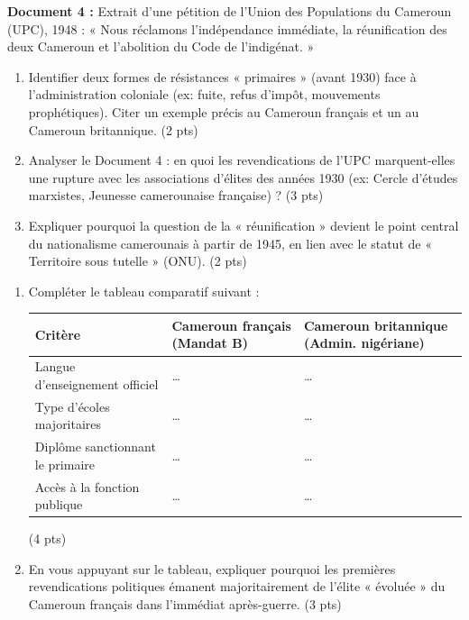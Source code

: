 \documentclass[11pt]{article}
\begin{document}
\begin{exercice}
\textbf{Document 4 :} Extrait d'une pétition de l'Union des Populations du Cameroun (UPC), 1948 : « Nous réclamons l'indépendance immédiate, la réunification des deux Cameroun et l'abolition du Code de l'indigénat. »
\begin{enumerate}
    \item Identifier deux formes de résistances « primaires » (avant 1930) face à l'administration coloniale (ex: fuite, refus d'impôt, mouvements prophétiques). Citer un exemple précis au Cameroun français et un au Cameroun britannique. (2 pts)
    \item Analyser le Document 4 : en quoi les revendications de l'UPC marquent-elles une rupture avec les associations d'élites des années 1930 (ex: Cercle d'études marxistes, Jeunesse camerounaise française) ? (3 pts)
    \item Expliquer pourquoi la question de la « réunification » devient le point central du nationalisme camerounais à partir de 1945, en lien avec le statut de « Territoire sous tutelle » (ONU). (2 pts)
\end{enumerate}
\end{exercice}

\begin{exercice}
\begin{enumerate}
    \item Compléter le tableau comparatif suivant :
\begin{center}
\begin{tabularx}{\linewidth}{lXX}
\toprule
Critère & Cameroun français (Mandat B) & Cameroun britannique (Admin. nigériane) \\
\midrule
Langue d'enseignement officiel & \dots & \dots \\
Type d'écoles majoritaires & \dots & \dots \\
Diplôme sanctionnant le primaire & \dots & \dots \\
Accès à la fonction publique & \dots & \dots \\
\bottomrule
\end{tabularx}
\end{center}
(4 pts)
    \item En vous appuyant sur le tableau, expliquer pourquoi les premières revendications politiques émanent majoritairement de l'élite « évoluée » du Cameroun français dans l'immédiat après-guerre. (3 pts)
\end{enumerate}
\end{exercice}
\end{document}
